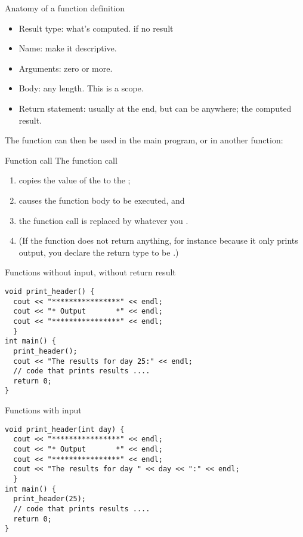 \begin{slide}{Anatomy of a function definition}
  \label{sl:func-anatomy}
  \begin{itemize}
  \item Result type: what's computed.  if no result
  \item Name: make it descriptive.
  \item Arguments: zero or more.\\
  \item Body: any length. This is a scope.
  \item Return statement: usually at the end, but can be anywhere; the
    computed result.
  \end{itemize}
\end{slide}

The function can then be used in the main program, or in another function:
\begin{block}{Function call}
  \label{sl:func-call}
  The function call
  \begin{enumerate}
  \item copies the value of the 
    to the ;
  \item causes the function body to be executed, and
  \item the function call is replaced by whatever you .
  \item (If the function does not return anything, for instance because
    it only prints output, you declare the return type to be .)
  \end{enumerate}
\end{block}

\begin{block}{Functions without input, without return result}
  \label{sl:func-ex1}
\begin{verbatim}
void print_header() {
  cout << "****************" << endl;
  cout << "* Output       *" << endl;
  cout << "****************" << endl;
  }
int main() {
  print_header();
  cout << "The results for day 25:" << endl;
  // code that prints results ....
  return 0;
}
\end{verbatim}
\end{block}

\begin{block}{Functions with input}
  \label{sl:func-ex2}
\begin{verbatim}
void print_header(int day) {
  cout << "****************" << endl;
  cout << "* Output       *" << endl;
  cout << "****************" << endl;
  cout << "The results for day " << day << ":" << endl;
  }
int main() {
  print_header(25);
  // code that prints results ....
  return 0;
}
\end{verbatim}
\end{block}

